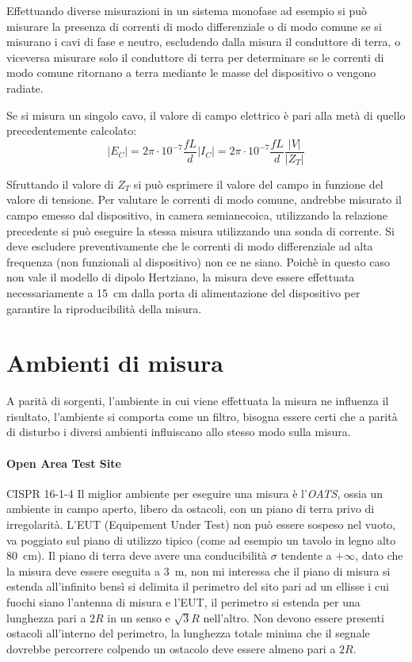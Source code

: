 Effettuando diverse misurazioni in un sistema monofase ad esempio si può misurare la presenza
di correnti di modo differenziale o di modo comune se si misurano i cavi di fase e neutro, escludendo 
dalla misura il conduttore di terra, o viceversa misurare solo il conduttore di terra per determinare
se le correnti di modo comune ritornano a terra mediante le masse del dispositivo o vengono radiate.

Se si misura un singolo cavo, il valore di campo elettrico è pari alla metà di quello precedentemente
calcolato:
$$
|E_C| = 2\pi\cdot10^{-7} \frac{fL}{d}|I_C| = 2\pi\cdot10^{-7}\frac{fL}{d}\frac{|V|}{|Z_T|}
$$

Sfruttando il valore di $Z_T$ si può esprimere il valore del campo in funzione del valore di tensione.
Per valutare le correnti di modo comune, andrebbe misurato il campo emesso dal dispositivo, in camera
semianecoica, utilizzando la 
relazione precedente si può eseguire la stessa misura utilizzando una sonda di corrente.
Si deve escludere preventivamente che le correnti di modo differenziale ad alta frequenza (non funzionali
al dispositivo) non ce ne siano.
Poichè in questo caso non vale il modello di dipolo Hertziano, la misura deve essere effettuata 
necessariamente a \SI{15}{\centi\meter} dalla porta di alimentazione del dispositivo per garantire
la riproducibilità della misura.

\section{Ambienti di misura}
A parità di sorgenti, l'ambiente in cui viene effettuata la misura ne influenza il risultato,
l'ambiente si comporta come un filtro, bisogna essere certi che a parità di disturbo i diversi 
ambienti influiscano allo stesso modo sulla misura.

\paragraph{Open Area Test Site}CISPR 16-1-4 Il miglior ambiente per eseguire una misura è l'\textit{OATS},
ossia un ambiente in campo aperto, libero da ostacoli, con un piano di terra privo di irregolarità.
L'EUT (Equipement Under Test) non può essere sospeso nel vuoto, va poggiato sul piano di utilizzo
tipico (come ad esempio un tavolo in legno alto \SI{80}{\centi\meter}).
Il piano di terra deve avere una conducibilità $\sigma$ tendente a $+\infty$, dato che la misura deve
essere eseguita a \SI{3}{\meter}, non mi interessa che il piano di misura si estenda all'infinito
bensì si delimita il perimetro del sito pari ad un ellisse i cui fuochi siano l'antenna di misura 
e l'EUT, il perimetro si estenda per una lunghezza pari a $2R$ in un senso e $\sqrt{3}R$ nell'altro.
Non devono essere presenti ostacoli all'interno del perimetro, la lunghezza totale minima che 
il segnale dovrebbe percorrere colpendo un ostacolo deve essere almeno pari a $2R$.

